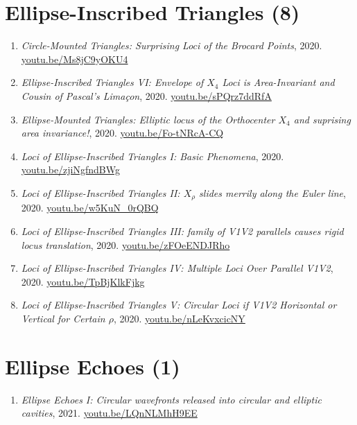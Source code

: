 \documentclass[12pt]{article}
\begin{document}
\section{Ellipse-Inscribed Triangles (8)}

\begin{enumerate}[resume]
\item \textit{Circle-Mounted Triangles: Surprising Loci of the Brocard Points}, 2020. \href{https://youtu.be/Ms8jC9yOKU4}{\url{youtu.be/Ms8jC9yOKU4}}
\item \textit{Ellipse-Inscribed Triangles VI: Envelope of $X_{4}$ Loci is Area-Invariant and Cousin of Pascal's Limaçon}, 2020. \href{https://youtu.be/sPQrz7ddRfA}{\url{youtu.be/sPQrz7ddRfA}}
\item \textit{Ellipse-Mounted Triangles: Elliptic locus of the Orthocenter $X_{4}$ and suprising area invariance!}, 2020. \href{https://youtu.be/Fo-tNRcA-CQ}{\url{youtu.be/Fo-tNRcA-CQ}}
\item \textit{Loci of Ellipse-Inscribed Triangles I: Basic Phenomena}, 2020. \href{https://youtu.be/zjiNgfndBWg}{\url{youtu.be/zjiNgfndBWg}}
\item \textit{Loci of Ellipse-Inscribed Triangles II: $X_\rho$ slides merrily along the Euler line}, 2020. \href{https://youtu.be/w5KuN_0rQBQ}{\url{youtu.be/w5KuN\_0rQBQ}}
\item \textit{Loci of Ellipse-Inscribed Triangles III: family of V1V2 parallels causes rigid locus translation}, 2020. \href{https://youtu.be/zFOeENDJRho}{\url{youtu.be/zFOeENDJRho}}
\item \textit{Loci of Ellipse-Inscribed Triangles IV: Multiple Loci Over Parallel V1V2}, 2020. \href{https://youtu.be/TpBjKlkFjkg}{\url{youtu.be/TpBjKlkFjkg}}
\item \textit{Loci of Ellipse-Inscribed Triangles V: Circular Loci if V1V2 Horizontal or Vertical for Certain $\rho$}, 2020. \href{https://youtu.be/nLeKvxcicNY}{\url{youtu.be/nLeKvxcicNY}}
\end{enumerate}

\section{Ellipse Echoes (1)}

\begin{enumerate}[resume]
\item \textit{Ellipse Echoes I: Circular wavefronts released into circular and elliptic cavities}, 2021. \href{https://youtu.be/LQnNLMhH9EE}{\url{youtu.be/LQnNLMhH9EE}}
\end{enumerate}
\end{document}
